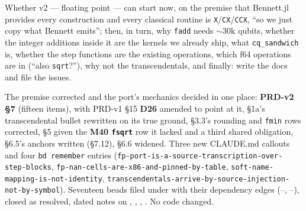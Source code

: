 Whether v2 --- floating point --- can start now, on the premise that Bennett.jl provides every
construction and every classical routine is \texttt{X}/\texttt{CX}/\texttt{CCX}, ``so we just copy what
Bennett emits''; then, in turn, why \texttt{fadd} needs $\sim$30k qubits, whether the integer
additions inside it are the kernels we already ship, what \texttt{cq\_sandwich} is, whether the
step functions are the existing operations, which f64 operations are in (``also \texttt{sqrt}?''),
why not the transcendentals, and finally: write the docs and file the issues.

The premise corrected and the port's mechanics decided in one place: \textbf{PRD-v2 \S7}
(fifteen items), with PRD-v1 \S15 \textbf{D26} amended to point at it, \S1a's transcendental
bullet rewritten on its true ground, \S3.3's rounding and \texttt{fmin} rows corrected, \S5 given
the \textbf{M40 \texttt{fsqrt}} row it lacked and a third shared obligation, \S6.5's anchors written
(\S7.12), \S6.6 widened. Three new CLAUDE.md callouts and four \texttt{bd remember} entries
(\texttt{fp-port-is-a-source-transcription-over-step-blocks},
\texttt{fp-nan-cells-are-x86-and-pinned-by-table}, \texttt{soft-name-mapping-is-not-identity},
\texttt{transcendentals-arrive-by-source-injection-not-by-symbol}). Seventeen beads filed under
 with their dependency edges (--, --),
 closed as resolved, dated notes on , , , . No
code changed.


